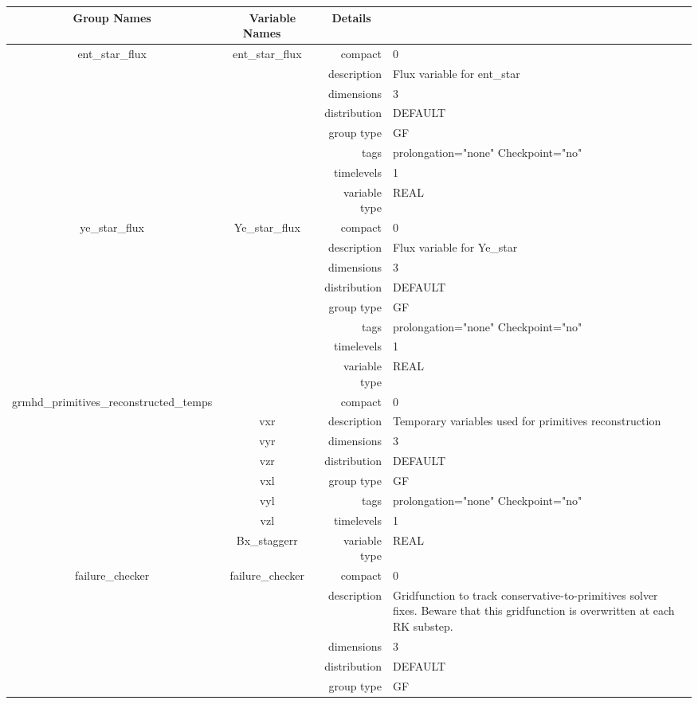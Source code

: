 \documentclass{article}
\begin{document}
\begin{tabular*}{150mm}{|c|c@{\extracolsep{\fill}}|rl|} \hline 
~ {\bf Group Names} ~ & ~ {\bf Variable Names} ~  &{\bf Details} ~ & ~ \\ 
\hline 
ent\_star\_flux & ent\_star\_flux & compact & 0 \\ 
 &  & description & Flux variable for ent\_star \\ 
 &  & dimensions & 3 \\ 
 &  & distribution & DEFAULT \\ 
 &  & group type & GF \\ 
 &  & tags & prolongation="none" Checkpoint="no" \\ 
 &  & timelevels & 1 \\ 
 &  & variable type & REAL \\ 
\hline 
ye\_star\_flux & Ye\_star\_flux & compact & 0 \\ 
 &  & description & Flux variable for Ye\_star \\ 
 &  & dimensions & 3 \\ 
 &  & distribution & DEFAULT \\ 
 &  & group type & GF \\ 
 &  & tags & prolongation="none" Checkpoint="no" \\ 
 &  & timelevels & 1 \\ 
 &  & variable type & REAL \\ 
\hline 
grmhd\_primitives\_reconstructed\_temps &  & compact & 0 \\ 
 & vxr & description & Temporary variables used for primitives reconstruction \\ 
 & vyr & dimensions & 3 \\ 
 & vzr & distribution & DEFAULT \\ 
 & vxl & group type & GF \\ 
 & vyl & tags & prolongation="none" Checkpoint="no" \\ 
 & vzl & timelevels & 1 \\ 
 & Bx\_staggerr & variable type & REAL \\ 
\hline 
failure\_checker & failure\_checker & compact & 0 \\ 
 &  & description & Gridfunction to track conservative-to-primitives solver fixes. Beware that this gridfunction is overwritten at each RK substep. \\ 
 &  & dimensions & 3 \\ 
 &  & distribution & DEFAULT \\ 
 &  & group type & GF \\ 

\end{tabular*}
\end{document}
